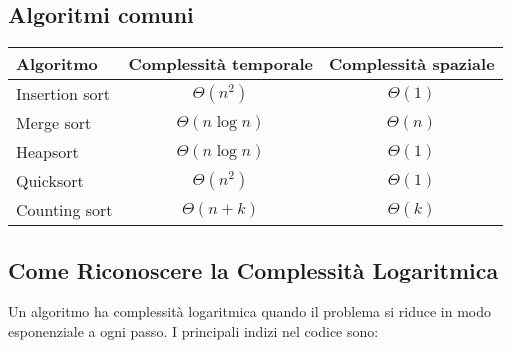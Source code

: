 \subsection{Algoritmi comuni}

\begin{center}
    \begin{tabular}{|l|c|c|}
        \hline
        \textbf{Algoritmo} & \textbf{Complessità temporale} & \textbf{Complessità spaziale} \\
        \hline
        Insertion sort & $\Theta(n^2)$ & $\Theta(1)$ \\
        \hline
        Merge sort & $\Theta(n \log n)$ & $\Theta(n)$ \\
        \hline
        Heapsort & $\Theta(n \log n)$ & $\Theta(1)$ \\
        \hline
        Quicksort & $\Theta(n^2)$ & $\Theta(1)$ \\
        \hline
        Counting sort & $\Theta(n+k)$ & $\Theta(k)$ \\
        \hline
    \end{tabular}
\end{center}

\subsection{Come Riconoscere la Complessità Logaritmica}

Un algoritmo ha complessità logaritmica quando il problema si riduce in modo esponenziale a ogni passo. I principali indizi nel codice sono:

